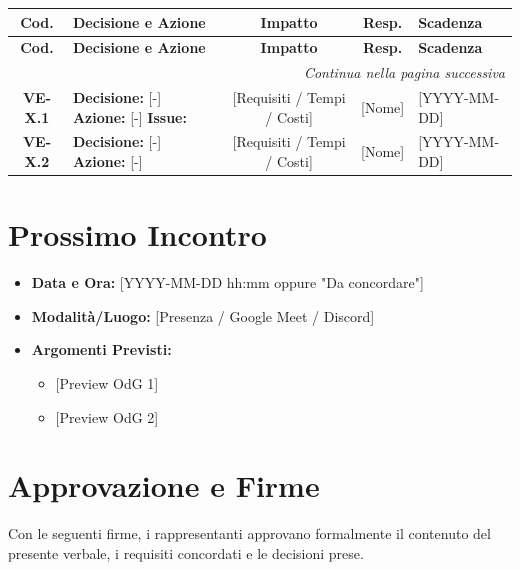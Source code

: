 \vspace{0.3cm}
\renewcommand{\arraystretch}{1.4}
\begin{longtable}{c p{6cm} c c l}
	\toprule
	\textbf{Cod.} & \textbf{Decisione e Azione} & \textbf{Impatto} & \textbf{Resp.} & \textbf{Scadenza} \\
	\midrule
	\endfirsthead

	\toprule
	\textbf{Cod.} & \textbf{Decisione e Azione} & \textbf{Impatto} & \textbf{Resp.} & \textbf{Scadenza} \\
	\midrule
	\endhead

	\midrule
	\multicolumn{5}{r}{\textit{Continua nella pagina successiva}} \\
	\midrule
	\endfoot

	\bottomrule
	\endlastfoot
	
	\textbf{VE-X.1} & 
	\textbf{Decisione:} {[-]} \newline 
	\textbf{Azione:} {[-]} \newline
	\textbf{Issue:} \ghissue{id} & 
	{[Requisiti / Tempi / Costi]} & 
	{[Nome]} & 
	{[YYYY-MM-DD]} \\
	
	\midrule
	
	\textbf{VE-X.2} & 
	\textbf{Decisione:} {[-]} \newline 
	\textbf{Azione:} {[-]} & 
	{[Requisiti / Tempi / Costi]} & 
	{[Nome]} & 
	{[YYYY-MM-DD]} \\
\end{longtable}

\section{Prossimo Incontro}
\begin{itemize}
	\item \textbf{Data e Ora:} {[YYYY-MM-DD hh:mm oppure "Da concordare"]}
	\item \textbf{Modalità/Luogo:} {[Presenza / Google Meet / Discord]}
	\item \textbf{Argomenti Previsti:}
	\begin{itemize}
		\item {[Preview OdG 1]}
		\item {[Preview OdG 2]}
	\end{itemize}
\end{itemize}

\newpage
\section*{Approvazione e Firme}
Con le seguenti firme, i rappresentanti approvano formalmente il contenuto del presente verbale, i requisiti concordati e le decisioni prese.

